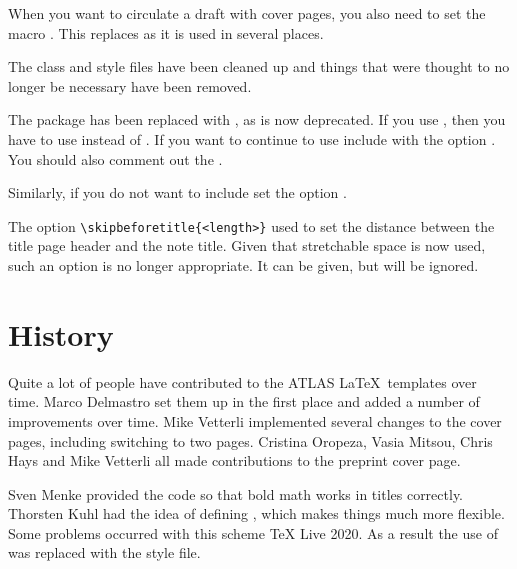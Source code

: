 When you want to circulate a draft with cover pages, 
you also need to set the macro .
This replaces  as it is used in several places.

The class and style files have been cleaned up and things 
that were thought to no longer be necessary have been removed.

The  package has been replaced with , as  is now deprecated.
If you use , then you have to use  instead of .
If you want to continue to use  include  with the option
. 
You should also comment out the .

Similarly, if you do not want to include  set
the option .

The option \verb|\skipbeforetitle{<length>}| used to set the distance between
the title page header and the note title. 
Given that stretchable space is now used, such an option is no longer appropriate.
It can be given, but will be ignored.

\section{History}

Quite a lot of people have contributed to the ATLAS \LaTeX\ templates over time.
Marco Delmastro set them up in the first place and added a number of improvements over time.
Mike Vetterli implemented several changes to the cover pages, including switching to two pages.
Cristina Oropeza, Vasia Mitsou, Chris Hays and Mike Vetterli all made contributions to the preprint cover page.

Sven Menke provided the code so that bold math works in titles correctly.
Thorsten Kuhl had the idea of defining , which makes things much more flexible.
Some problems occurred with this scheme \TeX{} Live 2020.
As a result the use of  was replaced with the  style file.

